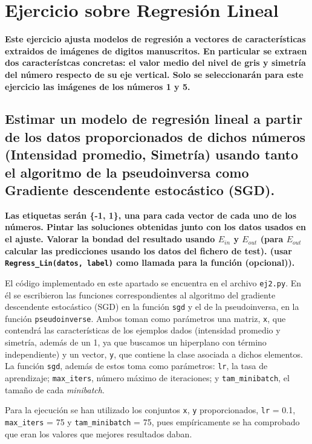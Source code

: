 \documentclass[a4paper, 20pt]{article}
\begin{document}
\section{Ejercicio sobre Regresión Lineal}
\textbf{Este ejercicio ajusta modelos de regresión a vectores de características extraidos de imágenes de digitos manuscritos. En particular se extraen dos característcas concretas: el valor medio del nivel de gris y simetría del número respecto de su eje vertical. Solo se seleccionarán para este ejercicio las imágenes de los números 1 y 5.}

\subsection{Estimar un modelo de regresión lineal a partir de los datos proporcionados de dichos números (Intensidad promedio, Simetría) usando tanto el algoritmo de la pseudoinversa como Gradiente descendente estocástico (SGD).}
\textbf{Las etiquetas serán \{-1, 1\}, una para cada vector de cada uno de los números. Pintar las soluciones obtenidas junto con los datos usados en el ajuste. Valorar la bondad del resultado usando $E_{in}$ y $E_{out}$ (para $E_{out}$ calcular las predicciones usando los datos del fichero de test). (usar \texttt{Regress\_Lin(datos, label)} como llamada para la función (opcional)).}

El código implementado en este apartado se encuentra en el archivo \texttt{ej2.py}. En él se escribieron las funciones correspondientes al algoritmo del gradiente descendente estocástico (SGD) en la función \texttt{sgd} y el de la pseudoinversa, en la función \texttt{pseudoinverse}. Ambos toman como parámetros una matriz, \texttt{x}, que contendrá las características de los ejemplos dados (intensidad promedio y simetría, además de un 1, ya que buscamos un hiperplano con término independiente) y un vector, \texttt{y}, que contiene la clase asociada a dichos elementos. La función \texttt{sgd}, además de estos toma como parámetros: \texttt{lr}, la tasa de aprendizaje; \texttt{max\_iters}, número máximo de iteraciones; y \texttt{tam\_minibatch}, el tamaño de cada \textit{minibatch}.

Para la ejecución se han utilizado los conjuntos \texttt{x}, \texttt{y} proporcionados, \texttt{lr} = 0.1, \texttt{max\_iters} = 75 y \texttt{tam\_minibatch} = 75, pues empíricamente se ha comprobado que eran los valores que mejores resultados daban.
\end{document}
